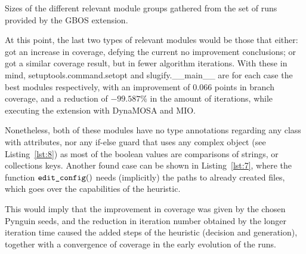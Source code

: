 \documentclass[%
  chapterprefix=false,%
  open=right,%
  twoside=true,%
  paper=a4,%
  logofile={Figures/logo.png},%
  thesistype=master,%
  UKenglish,%
]{se2thesis}
\newcommand{\callable}[2][]{\(\text{\texttt{#2}}(#1)\)}
\begin{document}
\begin{table}[t]
  \centering
  
\caption{Sizes of the different relevant module groups gathered from the set of runs provided by the GBOS extension.}\label{tab:flag_modules}
\end{table}

At this point, the last two types of relevant modules would be those that either: got an increase in coverage, defying the current no improvement conclusions; or got a similar coverage result, but in fewer algorithm iterations.
With these in mind, setuptools.command.setopt and slugify.\_\_main\_\_ are for each case the best modules respectively, with an improvement of \(0.066\) points in branch coverage, and a reduction of \(-99.587\%\) in the amount of iterations, while executing the extension with DynaMOSA and MIO.\@

Nonetheless, both of these modules have no type annotations regarding any class with attributes, nor any if-else guard that uses any complex object (see Listing~\ref{lst:8}) as most of the boolean values are comparisons of strings, or collections keys.
Another found case can be shown in Listing~\ref{lst:7}, where the function \callable[]{edit\_config} needs (implicitly) the paths to already created files, which goes over the capabilities of the heuristic.

This would imply that the improvement in coverage was given by the chosen Pynguin seeds, and the reduction in iteration number obtained by the longer iteration time caused the added steps of the heuristic (decision and generation), together with a convergence of coverage in the early evolution of the runs.
\end{document}
